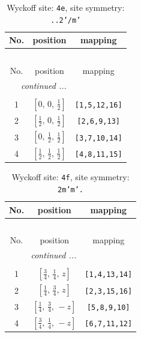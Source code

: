 \documentclass[fleqn,8pt]{jsarticle}
\begin{document}
\begin{longtable}{ccc}
\caption{Wyckoff site: {\tt 4e}, site symmetry: {\tt ..2'/m'}}
 \\
 \hline \hline
No. & position & mapping \\ \hline \endfirsthead

\multicolumn{2}{l}{\tablename\ \thetable{}} \\
 \hline \hline
No. & position & mapping \\ \hline \endhead

 \hline \hline
\multicolumn{2}{r}{\footnotesize\it continued ...} \\ \endfoot

 \hline \hline
\multicolumn{2}{r}{} \\ \endlastfoot

1 & $\left[ 0,\, 0,\, \frac{1}{2} \right]$ & {\tt [1,5,12,16]} \\ \hline
2 & $\left[ \frac{1}{2},\, 0,\, \frac{1}{2} \right]$ & {\tt [2,6,9,13]} \\ \hline
3 & $\left[ 0,\, \frac{1}{2},\, \frac{1}{2} \right]$ & {\tt [3,7,10,14]} \\ \hline
4 & $\left[ \frac{1}{2},\, \frac{1}{2},\, \frac{1}{2} \right]$ & {\tt [4,8,11,15]} \\
\end{longtable}
\renewcommand{\arraystretch}{1.2}
\begin{longtable}{ccc}
\caption{Wyckoff site: {\tt 4f}, site symmetry: {\tt 2m'm'.}}
 \\
 \hline \hline
No. & position & mapping \\ \hline \endfirsthead

\multicolumn{2}{l}{\tablename\ \thetable{}} \\
 \hline \hline
No. & position & mapping \\ \hline \endhead

 \hline \hline
\multicolumn{2}{r}{\footnotesize\it continued ...} \\ \endfoot

 \hline \hline
\multicolumn{2}{r}{} \\ \endlastfoot

1 & $\left[ \frac{3}{4},\, \frac{1}{4},\, z \right]$ & {\tt [1,4,13,14]} \\ \hline
2 & $\left[ \frac{1}{4},\, \frac{3}{4},\, z \right]$ & {\tt [2,3,15,16]} \\ \hline
3 & $\left[ \frac{1}{4},\, \frac{3}{4},\, - z \right]$ & {\tt [5,8,9,10]} \\ \hline
4 & $\left[ \frac{3}{4},\, \frac{1}{4},\, - z \right]$ & {\tt [6,7,11,12]} \\
\end{longtable}
\end{document}
